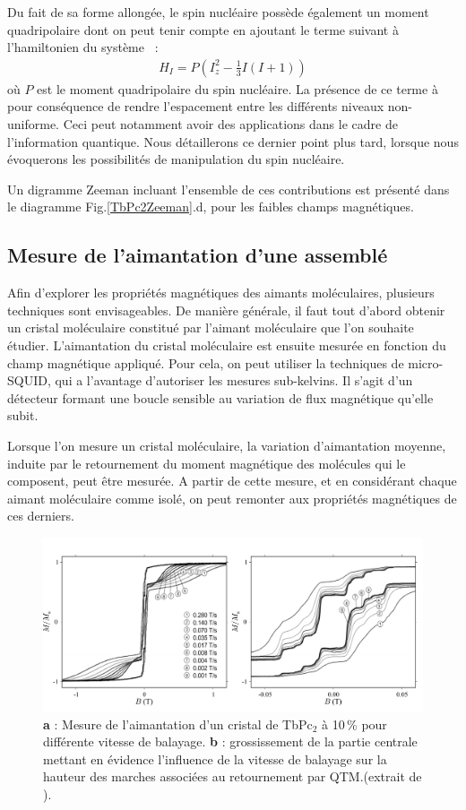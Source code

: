 Du fait de sa forme allongée, le spin nucléaire possède également un moment quadripolaire dont on peut tenir compte en ajoutant le terme suivant à l'hamiltonien du système~\cite{Bleaney1961} :
\begin{eqnarray}
H_I = P\left(I_z^2 - \frac{1}{3}I(I+1)\right)
\end{eqnarray}
où $P$ est le moment quadripolaire du spin nucléaire. La présence de ce terme à pour conséquence de rendre l'espacement entre les différents niveaux non-uniforme. Ceci peut notamment avoir des applications dans le cadre de l'information quantique. Nous détaillerons ce dernier point plus tard, lorsque nous évoquerons les possibilités de manipulation du spin nucléaire.

Un digramme Zeeman incluant l'ensemble de ces contributions est présenté dans le diagramme Fig.\ref{TbPc2Zeeman}.d, pour les faibles champs magnétiques.



\subsection{Mesure de l'aimantation d'une assemblé}
Afin d'explorer les propriétés magnétiques des aimants moléculaires, plusieurs techniques sont envisageables. De manière générale, il faut tout d'abord obtenir un cristal moléculaire constitué par l'aimant moléculaire que l'on souhaite étudier. L'aimantation du cristal moléculaire est ensuite mesurée en fonction du champ magnétique appliqué. Pour cela, on peut utiliser la techniques de micro-SQUID, qui a l'avantage d'autoriser les mesures sub-kelvins. Il s'agit d'un détecteur formant une boucle sensible au variation de flux magnétique qu'elle subit.

Lorsque l'on mesure un cristal moléculaire, la variation d'aimantation moyenne, induite par le retournement du moment magnétique des molécules qui le composent, peut être mesurée. A partir de cette mesure, et en considérant chaque aimant moléculaire comme isolé, on peut remonter aux propriétés magnétiques de ces derniers.

\begin{figure}
\centering \includegraphics[scale=0.45]{Resultats/MesureAimant/MesureAimant.pdf} 
\caption{\textbf{a} : Mesure de l'aimantation d'un cristal de TbPc$_2$ à 10\,\% pour différente vitesse de balayage. \textbf{b} : grossissement de la partie centrale mettant en évidence l'influence de la vitesse de balayage sur la hauteur des marches associées au retournement par QTM.(extrait de \cite{Ishikawa2005}).}
\label{TbPc2Aimantation}
\end{figure}


